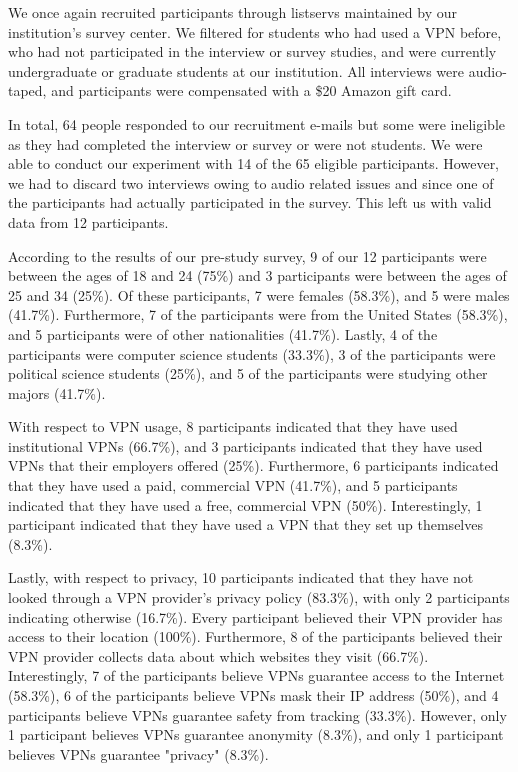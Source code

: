 We once again recruited participants through listservs maintained by our
institution's survey center.  We filtered for students who had used a VPN
before, who had not participated in the interview or survey studies, and were
currently undergraduate or graduate students at our institution.  All
interviews were audio-taped, and participants were compensated with a \$20
Amazon gift card.

In total, 64 people responded to our recruitment e-mails but some were
ineligible as they had completed the interview or survey or were not students.
We were able to conduct our experiment with 14 of the 65 eligible
participants.  However, we had to discard two interviews owing to audio
related issues and since one of the participants had actually participated in
the survey.  This left us with valid data from 12 participants.

According to the results of our pre-study survey, 9 of our 12 participants were between the ages of 18 and 24 (75\%) and 3 participants were between the ages of 25 and 34 (25\%).
Of these participants, 7 were females (58.3\%), and 5 were males (41.7\%).
Furthermore, 7 of the participants were from the United States (58.3\%), and 5 participants were of other nationalities (41.7\%). 
Lastly, 4 of the participants were computer science students (33.3\%), 3 of the participants were political science students (25\%), and 5 of the participants were studying other majors (41.7\%).

With respect to VPN usage, 8 participants indicated that they have used institutional VPNs (66.7\%), and 3 participants indicated that they have used VPNs that their employers offered (25\%).
Furthermore, 6 participants indicated that they have used a paid, commercial VPN (41.7\%), and 5 participants indicated that they have used a free, commercial VPN (50\%).
Interestingly, 1 participant indicated that they have used a VPN that they set up themselves (8.3\%).

Lastly, with respect to privacy, 10 participants indicated that they have not looked through a VPN provider's privacy policy (83.3\%), with only 2 participants indicating otherwise (16.7\%).
Every participant believed their VPN provider has access to their location (100\%).
Furthermore, 8 of the participants believed their VPN provider collects data about which websites they visit (66.7\%).
Interestingly, 7 of the participants believe VPNs guarantee access to the Internet (58.3\%), 6 of the participants believe VPNs mask their IP address (50\%), and 4 participants believe VPNs guarantee safety from tracking (33.3\%).
However, only 1 participant believes VPNs guarantee anonymity (8.3\%), and only 1 participant believes VPNs guarantee "privacy" (8.3\%).

